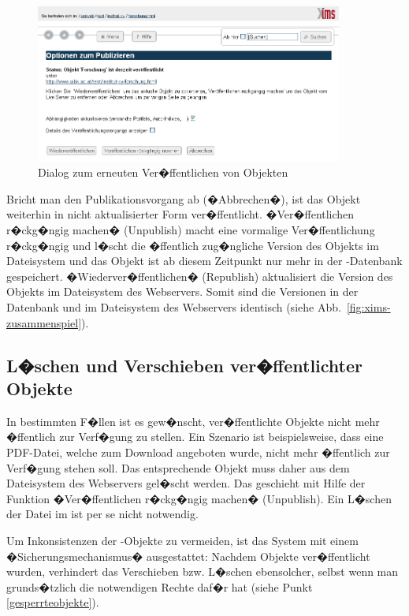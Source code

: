 \begin{figure}[!ht]
	\centering
		\includegraphics[width=0.9\textwidth]{./images/XI5S-republish.png}
	\caption{Dialog zum erneuten Ver�ffentlichen von Objekten}
	\label{fig:xims-republish}
\end{figure}

Bricht man den Publikationsvorgang ab (�Abbrechen�), ist das Objekt weiterhin in
nicht aktualisierter Form ver�ffentlicht.
�Ver�ffentlichen r�ckg�ngig machen� (Unpublish) macht eine vormalige
Ver�ffentlichung r�ckg�ngig und l�scht die �ffentlich zug�ngliche Version des
Objekts im Dateisystem und das Objekt ist ab diesem Zeitpunkt nur mehr in der
-Datenbank gespeichert.
�Wiederver�ffentlichen� (Republish) aktualisiert die Version des Objekts im
Dateisystem des Webservers. Somit sind die Versionen in der Datenbank und im Dateisystem des Webservers identisch (siehe Abb.~\ref{fig:xims-zusammenspiel}).

\subsection{L�schen und Verschieben ver�ffentlichter Objekte}
\label{deletepublished}

In bestimmten F�llen ist es gew�nscht, ver�ffentlichte Objekte nicht mehr �ffentlich
zur Verf�gung zu stellen. Ein Szenario ist beispielsweise, dass eine PDF-Datei,
welche zum Download angeboten wurde, nicht mehr �ffentlich zur Verf�gung
stehen soll. Das entsprechende Objekt muss daher aus dem Dateisystem des
Webservers gel�scht werden. Das geschieht mit Hilfe der Funktion
�Ver�ffentlichen r�ckg�ngig machen� (Unpublish). Ein L�schen der Datei im
 ist per se nicht notwendig.

Um Inkonsistenzen der -Objekte zu vermeiden, ist das System mit einem
�Sicherungsmechanismus� ausgestattet:
Nachdem Objekte ver�ffentlicht wurden, verhindert  das Verschieben bzw.
L�schen ebensolcher, selbst wenn man grunds�tzlich die notwendigen Rechte daf�r
hat (siehe Punkt \ref{gesperrteobjekte}).

